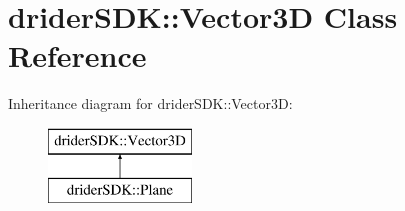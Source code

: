 \hypertarget{classdrider_s_d_k_1_1_vector3_d}{}\section{drider\+S\+DK\+:\+:Vector3D Class Reference}
\label{classdrider_s_d_k_1_1_vector3_d}
Inheritance diagram for drider\+S\+DK\+:\+:Vector3D\+:\begin{figure}[H]
\begin{center}
\leavevmode
\includegraphics[height=2.000000cm]{classdrider_s_d_k_1_1_vector3_d}
\end{center}
\end{figure}
